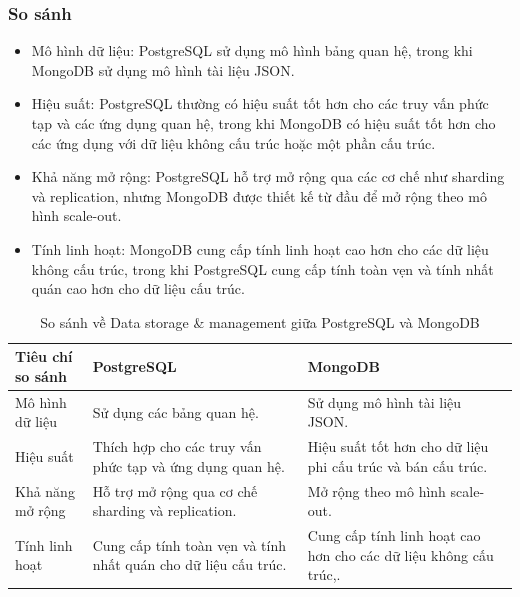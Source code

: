 \subsubsection{So sánh}
\begin{itemize}
    \item Mô hình dữ liệu: PostgreSQL sử dụng mô hình bảng quan hệ, trong khi MongoDB sử dụng mô hình tài liệu JSON.
    \item Hiệu suất: PostgreSQL thường có hiệu suất tốt hơn cho các truy vấn phức tạp và các ứng dụng quan hệ, trong khi MongoDB có hiệu suất tốt hơn cho các ứng dụng với dữ liệu không cấu trúc hoặc một phần cấu trúc.
    \item Khả năng mở rộng: PostgreSQL hỗ trợ mở rộng qua các cơ chế như sharding và replication, nhưng MongoDB được thiết kế từ đầu để mở rộng theo mô hình scale-out.
    \item Tính linh hoạt: MongoDB cung cấp tính linh hoạt cao hơn cho các dữ liệu không cấu trúc, trong khi PostgreSQL cung cấp tính toàn vẹn và tính nhất quán cao hơn cho dữ liệu cấu trúc.
\end{itemize}

\begin{table}[H]
    \centering
    \begin{tabular}{|L{3.2cm}|L{5cm}|L{5cm}|} \hline 
         \textbf{Tiêu chí so sánh }&  \textbf{PostgreSQL}&  \textbf{MongoDB}\\ \hline 
         Mô hình dữ liệu &  Sử dụng các bảng quan hệ. & Sử dụng mô hình tài liệu JSON.\\ \hline 
         Hiệu suất &  Thích hợp cho các truy vấn phức tạp và ứng dụng quan hệ. & Hiệu suất tốt hơn cho dữ liệu phi cấu trúc và bán cấu trúc.\\ \hline 
         Khả năng mở rộng &  Hỗ trợ mở rộng qua cơ chế sharding và replication. &  Mở rộng theo mô hình scale-out.\\ \hline
         Tính linh hoạt &  Cung cấp tính toàn vẹn và tính nhất quán cho dữ liệu cấu trúc. &  Cung cấp tính linh hoạt cao hơn cho các dữ liệu không cấu trúc,.\\ \hline 
    \end{tabular}
    \caption{So sánh về Data storage \& management giữa PostgreSQL và MongoDB}
    \label{tab:data_storage&management}
\end{table}
\newpage